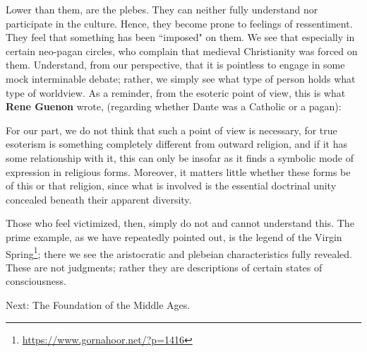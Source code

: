 Lower than them, are the plebes. They can neither fully understand nor participate in the culture. Hence, they become prone to feelings of ressentiment. They feel that something has been ``imposed" on them. We see that especially in certain neo-pagan circles, who complain that medieval Christianity was forced on them. Understand, from our perspective, that it is pointless to engage in some mock interminable debate; rather, we simply see what type of person holds what type of worldview. As a reminder, from the esoteric point of view, this is what \textbf{Rene Guenon} wrote, (regarding whether Dante was a Catholic or a pagan):

\begin{quotex}
For our part, we do not think that such a point of view is necessary, for true esoterism is something completely different from outward religion, and if it has some relationship with it, this can only be insofar as it finds a symbolic mode of expression in religious forms. Moreover, it matters little whether these forms be of this or that religion, since what is involved is the essential doctrinal unity concealed beneath their apparent diversity. 

\end{quotex}
Those who feel victimized, then, simply do not and cannot understand this. The prime example, as we have repeatedly pointed out, is the legend of the Virgin Spring\footnote{\url{https://www.gornahoor.net/?p=1416}}; there we see the aristocratic and plebeian characteristics fully revealed. These are not judgments; rather they are descriptions of certain states of consciousness.

Next: The Foundation of the Middle Ages.

